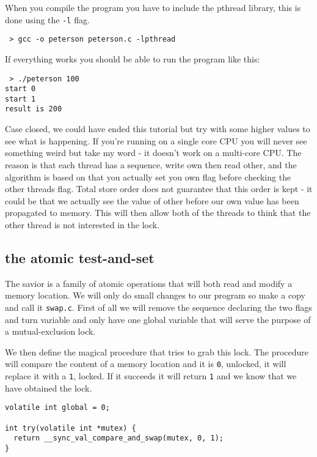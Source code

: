 \documentclass[a4paper,11pt]{article}
\begin{document}
When you compile the program you have to include the pthread library,
this is done using the {\tt -l} flag.

\begin{verbatim}
 > gcc -o peterson peterson.c -lpthread
\end{verbatim}

If everything works you should be able to run the program like this:

\begin{verbatim}
 > ./peterson 100
start 0
start 1
result is 200
\end{verbatim}

Case closed, we could have ended this tutorial but try with some
higher values to see what is happening. If you're running on a single
core CPU you will never see something weird but take my word - it
doesn't work on a multi-core CPU. The reason is that each thread has a
sequence, write own then read other, and the algorithm is based on
that you actually set you own flag before checking the other threads
flag. Total store order does not guarantee that this order is kept -
it could be that we actually see the value of other before our own
value has been propagated to memory. This will then allow both of the
threads to think that the other thread is not interested in the lock.

\subsection{the atomic test-and-set}

The savior is a family of atomic operations that will both read and
modify a memory location. We will only do small changes to our program
so make a copy and call it {\tt swap.c}. First of all we will remove
the sequence declaring the two flags and turn variable and only have
one global variable that will serve the purpose of a mutual-exclusion
lock. 

We then define the magical procedure that tries to grab this
lock. The procedure will compare the content of a memory location and
it is {\tt 0}, unlocked, it will replace it with a {\tt 1}, locked. If
it succeeds it will return {\tt 1} and we know that we have obtained
the lock.

\begin{lstlisting}
volatile int global = 0;

int try(volatile int *mutex) {
  return __sync_val_compare_and_swap(mutex, 0, 1);
}
\end{lstlisting}
\end{document}
